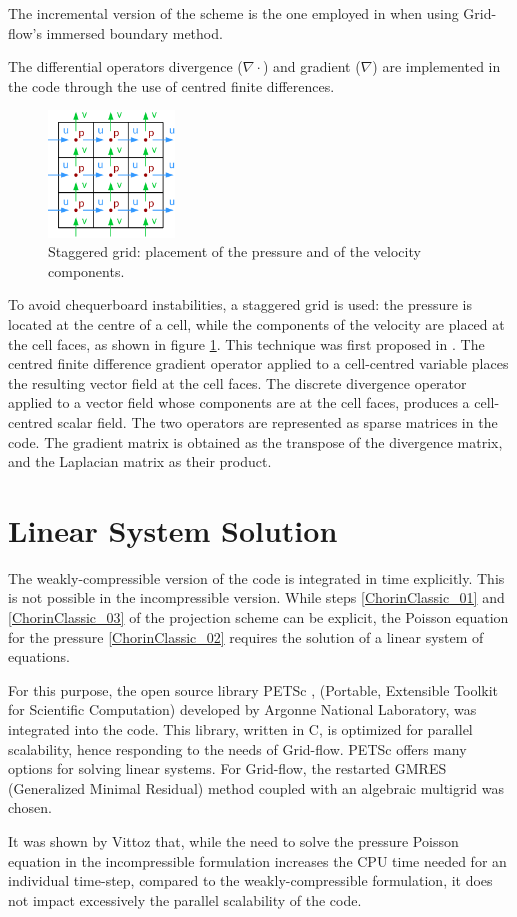 \documentclass[11pt, a4paper, oneside, openany]{book}
\begin{document}
The incremental version of the scheme is the one employed in \cite{Vittoz2018} when using Grid-flow's immersed boundary method.\par
The differential operators divergence ($\nabla\cdot$) and gradient ($\nabla$) are implemented in the code through the use of centred finite differences.
\begin{figure}[!ht]
	\centering
	\includegraphics[width=0.3\textwidth]{StaggeredGrid.pdf}
	\caption[Staggered Grid]{Staggered grid: placement of the pressure and of the velocity components.}
	\label{StaggeredGrid}
\end{figure}\noindent
To avoid chequerboard instabilities, a staggered grid is used: the pressure is located at the centre of a cell, while the components of the velocity are placed at the cell faces, as shown in figure \ref{StaggeredGrid}. This technique was first proposed in \cite{harlow1965numerical}. The centred finite difference gradient operator applied to a cell-centred variable places the resulting vector field at the cell faces. The discrete divergence operator applied to a vector field whose components are at the cell faces, produces a cell-centred scalar field. The two operators are represented as sparse matrices in the code. The gradient matrix is obtained as the transpose of the divergence matrix, and the Laplacian matrix as their product.
\section{Linear System Solution}\label{Chapter_Solver_Section_Linear_System_Solution}
The weakly-compressible version of the code is integrated in time explicitly. This is not possible in the incompressible version. While steps \eqref{ChorinClassic_01} and \eqref{ChorinClassic_03} of the projection scheme can be explicit, the Poisson equation for the pressure \eqref{ChorinClassic_02} requires the solution of a linear system of equations.\par
For this purpose, the open source library PETSc \cite{petsc-user-ref}\cite{petsc-web-page}, (Portable, Extensible Toolkit for Scientific Computation) developed by Argonne National Laboratory, was integrated into the code. This library, written in C, is optimized for parallel scalability, hence responding to the needs of Grid-flow. PETSc offers many options for solving linear systems. For Grid-flow, the restarted GMRES (Generalized Minimal Residual) method coupled with an algebraic multigrid  was chosen.\par
It was shown by Vittoz \cite{Vittoz2018} that, while the need to solve the pressure Poisson equation in the incompressible formulation increases the CPU time needed for an individual time-step, compared to the weakly-compressible formulation, it does not impact excessively the parallel scalability of the code.
\end{document}
